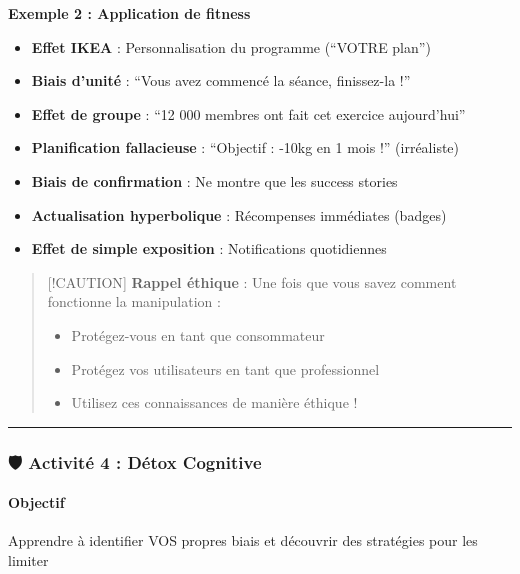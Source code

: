 \documentclass[
]{article}
\providecommand{\tightlist}{%
  \setlength{\itemsep}{0pt}\setlength{\parskip}{0pt}}
\begin{document}
\textbf{Exemple 2 : Application de fitness}

\begin{itemize}
\tightlist
\item
  \textbf{Effet IKEA} : Personnalisation du programme (``VOTRE plan'')
\item
  \textbf{Biais d'unité} : ``Vous avez commencé la séance, finissez-la
  !''
\item
  \textbf{Effet de groupe} : ``12 000 membres ont fait cet exercice
  aujourd'hui''
\item
  \textbf{Planification fallacieuse} : ``Objectif : -10kg en 1 mois !''
  (irréaliste)
\item
  \textbf{Biais de confirmation} : Ne montre que les success stories
\item
  \textbf{Actualisation hyperbolique} : Récompenses immédiates (badges)
\item
  \textbf{Effet de simple exposition} : Notifications quotidiennes
\end{itemize}

\begin{quote}
{[}!CAUTION{]} \textbf{Rappel éthique} : Une fois que vous savez comment
fonctionne la manipulation :

\begin{itemize}
\tightlist
\item
  Protégez-vous en tant que consommateur
\item
  Protégez vos utilisateurs en tant que professionnel
\item
  Utilisez ces connaissances de manière éthique !
\end{itemize}
\end{quote}

\begin{center}\rule{0.5\linewidth}{0.5pt}\end{center}

\subsubsection{🛡️ Activité 4 : Détox
Cognitive}\label{activituxe9-4-duxe9tox-cognitive}

\paragraph{\texorpdfstring{\textbf{Objectif}}{Objectif}}\label{objectif-2}

Apprendre à identifier VOS propres biais et découvrir des stratégies
pour les limiter
\end{document}
